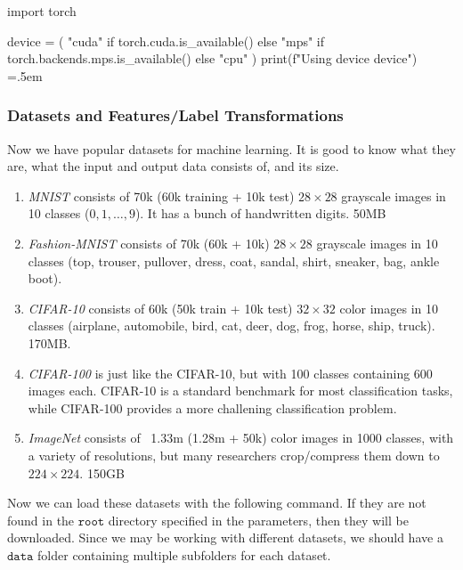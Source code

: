 \documentclass{article}
\newenvironment{cverbatim}
    {\SaveVerbatim{cverb}}
    {\endSaveVerbatim
      \flushleft\fboxrule=0pt\fboxsep=.5em
      \colorbox{cverbbg}{%
        \makebox[\dimexpr\linewidth-2\fboxsep][l]{\BUseVerbatim{cverb}}%
      }
      \endflushleft
  }
\theoremstyle{definition}
\theoremstyle{remark}
\theoremstyle{definition}
\begin{document}
    \begin{cverbatim}
      import torch

      device = (
        "cuda"
        if torch.cuda.is_available()
        else "mps"
        if torch.backends.mps.is_available()
        else "cpu"
      )
      print(f"Using {device} device")
    \end{cverbatim}

    \subsubsection{Datasets and Features/Label Transformations}

      Now we have popular datasets for machine learning. It is good to know what they are, what the input and output data consists of, and its size. 
      \begin{enumerate}
          \item \textit{MNIST} consists of 70k (60k training + 10k test) $28 \times 28$ grayscale images in 10 classes ($0, 1, \ldots, 9$). It has a bunch of handwritten digits. 50MB 

          \item \textit{Fashion-MNIST} consists of 70k (60k + 10k) $28 \times 28$ grayscale images in 10 classes (top, trouser, pullover, dress, coat, sandal, shirt, sneaker, bag, ankle boot). 

          \item \textit{CIFAR-10} consists of 60k (50k train + 10k test) $32 \times 32$ color images in 10 classes (airplane, automobile, bird, cat, deer, dog, frog, horse, ship, truck). 170MB. 

          \item \textit{CIFAR-100} is just like the CIFAR-10, but with 100 classes containing 600 images each. CIFAR-10 is a standard benchmark for most classification tasks, while CIFAR-100 provides a more challening classification problem. 

          \item \textit{ImageNet} consists of ~1.33m (1.28m + 50k) color images in 1000 classes, with a variety of resolutions, but many researchers crop/compress them down to $224 \times 224$. 150GB 
      \end{enumerate}

      Now we can load these datasets with the following command. If they are not found in the $\texttt{root}$ directory specified in the parameters, then they will be downloaded. Since we may be working with different datasets, we should have a $\texttt{data}$ folder containing multiple subfolders for each dataset. 
\end{document}
